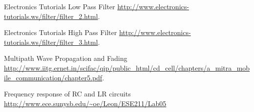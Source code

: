 \documentclass[a4paper, 12pt, english]{article}
\begin{document}
\patchcmd{\thebibliography}{\section*}{\section}{}{}
\begin{thebibliography}{99}

	Electronics Tutorials Low Pass Filter
	\url{http://www.electronics-tutorials.ws/filter/filter_2.html}.

	Electronics Tutorials High Pass Filter
	\url{http://www.electronics-tutorials.ws/filter/filter_3.html}.

	Multipath Wave Propagation
	and Fading
	\url{http://www.iitg.ernet.in/scifac/qip/public_html/cd_cell/chapters/a_mitra_mobile_communication/chapter5.pdf}.

	Frequency response of RC and LR circuits
	\url{http://www.ece.sunysb.edu/~oe/Leon/ESE211/Lab05}

\end{thebibliography}
\noindent
\end{document}
